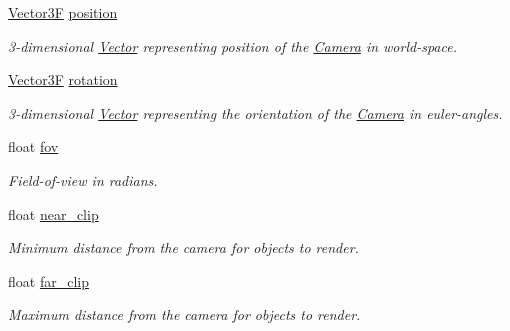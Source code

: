 \begin{DoxyCompactItemize}
\item 
\mbox{\label{class_camera_a24e0a32af9643efb3e81306e184417ea}} 
\mbox{\hyperlink{class_vector3}{Vector3F}} \mbox{\hyperlink{class_camera_a24e0a32af9643efb3e81306e184417ea}{position}}
\begin{DoxyCompactList}\small\item\em 3-\/dimensional \mbox{\hyperlink{class_vector}{Vector}} representing position of the \mbox{\hyperlink{class_camera}{Camera}} in world-\/space. \end{DoxyCompactList}\item 
\mbox{\label{class_camera_a573539a21c05976f45ca9d1d1fab937d}} 
\mbox{\hyperlink{class_vector3}{Vector3F}} \mbox{\hyperlink{class_camera_a573539a21c05976f45ca9d1d1fab937d}{rotation}}
\begin{DoxyCompactList}\small\item\em 3-\/dimensional \mbox{\hyperlink{class_vector}{Vector}} representing the orientation of the \mbox{\hyperlink{class_camera}{Camera}} in euler-\/angles. \end{DoxyCompactList}\item 
\mbox{\label{class_camera_aff7393c9cfbccd7e369091f00008da93}} 
float \mbox{\hyperlink{class_camera_aff7393c9cfbccd7e369091f00008da93}{fov}}
\begin{DoxyCompactList}\small\item\em Field-\/of-\/view in radians. \end{DoxyCompactList}\item 
\mbox{\label{class_camera_a1a1001125f472d5aff8ca9b27c04675c}} 
float \mbox{\hyperlink{class_camera_a1a1001125f472d5aff8ca9b27c04675c}{near\+\_\+clip}}
\begin{DoxyCompactList}\small\item\em Minimum distance from the camera for objects to render. \end{DoxyCompactList}\item 
\mbox{\label{class_camera_af93067b3c46c4525dfdf1d192457c277}} 
float \mbox{\hyperlink{class_camera_af93067b3c46c4525dfdf1d192457c277}{far\+\_\+clip}}
\begin{DoxyCompactList}\small\item\em Maximum distance from the camera for objects to render. \end{DoxyCompactList}\end{DoxyCompactItemize}


